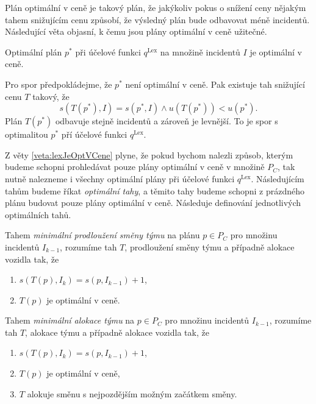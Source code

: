 Plán optimální v ceně je takový plán, že jakýkoliv pokus o snížení ceny nějakým tahem snižujícím cenu způsobí, že výsledný plán bude odbavovat méně incidentů.
Následující věta objasní, k čemu jsou plány optimální v ceně užitečné.
\begin{veta}\label{veta:lexJeOptVCene}
  Optimální plán $p^*$ při účelové funkci $q^{\text{Lex}}$ na množině incidentů $I$ je optimální v ceně.
\end{veta}
\begin{dukaz}
  Pro spor předpokládejme, že $p^*$ není optimální v ceně.
  Pak existuje tah snižující cenu $T$ takový, že
  \begin{equation*}
    s(T(p^*), I) = s(p^*, I) \land u(T(p^*)) < u(p^*).
  \end{equation*}
  Plán $T(p^*)$ odbavuje stejně incidentů a zároveň je levnější.
  To je spor s optimalitou $p^*$ pří účelové funkci $q^{\text{Lex}}$.
\end{dukaz}

Z věty \ref{veta:lexJeOptVCene} plyne, že pokud bychom nalezli způsob, kterým budeme schopni prohledávat pouze plány optimální v ceně v množině $P_C$, tak nutně
nalezneme i všechny optimální plány při účelové funkci $q^{\text{Lex}}$.
Následujícím tahům budeme říkat \textit{optimální tahy}, a těmito tahy budeme schopni z prázdného plánu budovat pouze plány optimální v ceně.
Následuje definování jednotlivých optimálních tahů.

\begin{definice}
  Tahem \textit{minimální prodloužení směny týmu} na plánu $p \in P_C$ pro množinu incidentů $I_{k-1}$, rozumíme tah $T$, prodloužení směny týmu a případně alokace vozidla tak, že
  \begin{enumerate}
    \item
      $s(T(p), I_{k}) = s(p, I_{k-1}) + 1$,
    \item
      $T(p)$ je optimální v ceně.
  \end{enumerate}
\end{definice}

\begin{definice}
  Tahem \textit{minimální alokace týmu} na $p \in P_C$ pro množinu incidentů $I_{k-1}$, rozumíme tah $T$, alokace týmu a případně alokace vozidla tak, že
  \begin{enumerate}
    \item
      $s(T(p), I_k) = s(p, I_{k-1}) + 1$,

    \item
      $T(p)$ je optimální v ceně,


    \item
      $T$ alokuje směnu s nejpozdějším možným začátkem směny.
  \end{enumerate}
\end{definice}

